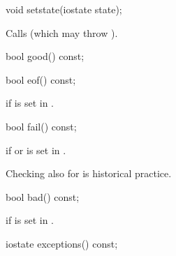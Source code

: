 %
\begin{itemdecl}
void setstate(iostate state);
\end{itemdecl}

\begin{itemdescr}
\pnum
\effects
Calls
(which may throw
).
\end{itemdescr}

%
\begin{itemdecl}
bool good() const;
\end{itemdecl}

\begin{itemdescr}
\pnum
\returns
{}
\end{itemdescr}

%
\begin{itemdecl}
bool eof() const;
\end{itemdecl}

\begin{itemdescr}
\pnum
\returns
{}
if
is set in
.
\end{itemdescr}

%
\begin{itemdecl}
bool fail() const;
\end{itemdecl}

\begin{itemdescr}
\pnum
\returns
{}
if
or
is set in
.
\begin{footnote}
Checking
also for
is historical practice.
\end{footnote}
\end{itemdescr}

%
\begin{itemdecl}
bool bad() const;
\end{itemdecl}

\begin{itemdescr}
\pnum
\returns
{}
if
is set in
.
\end{itemdescr}

%
\begin{itemdecl}
iostate exceptions() const;
\end{itemdecl}

